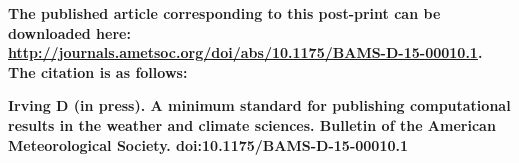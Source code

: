 \textbf{The published article corresponding to this post-print can be downloaded here: \url{http://journals.ametsoc.org/doi/abs/10.1175/BAMS-D-15-00010.1}. The citation is as follows:}    

\textbf{Irving D (in press). A minimum standard for publishing computational results in the weather and climate sciences. Bulletin of the American Meteorological Society. doi:10.1175/BAMS-D-15-00010.1}